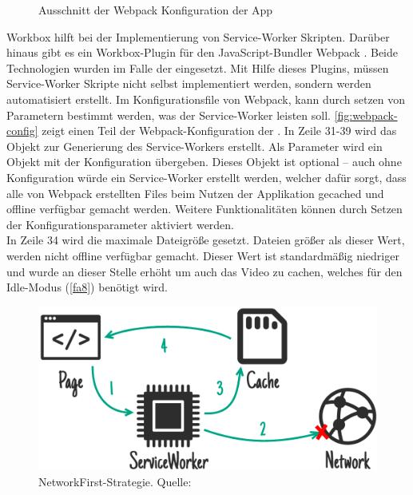 \begin{figure}
  
  \caption{Ausschnitt der Webpack Konfiguration der \shst{} App}
  \label{fig:webpack-config}
\end{figure}

Workbox hilft bei der Implementierung von Service-Worker Skripten. Darüber hinaus gibt es ein 
Workbox-Plugin \cite{workbox-webpack-plugin} für den JavaScript-Bundler Webpack \cite{webpack}. 
Beide Technologien wurden im Falle der \shst{} eingesetzt. Mit Hilfe dieses Plugins, müssen 
Service-Worker Skripte nicht selbst implementiert werden, sondern werden automatisiert erstellt.
Im Konfigurationsfile von Webpack, kann durch setzen von Parametern bestimmt werden, was
der Service-Worker leisten soll. \autoref{fig:webpack-config} zeigt einen Teil der 
Webpack-Konfiguration der \shst{}. In Zeile 31-39 wird das Objekt zur Generierung des
Service-Workers erstellt. Als Parameter wird ein Objekt mit der Konfiguration übergeben. 
Dieses Objekt ist optional -- auch ohne Konfiguration würde ein Service-Worker erstellt werden,
welcher dafür sorgt, dass alle von Webpack erstellten Files beim Nutzen der Applikation
gecached und offline verfügbar gemacht werden. Weitere Funktionalitäten können durch
Setzen der Konfigurationsparameter aktiviert werden.\\
In Zeile 34 wird die maximale Dateigröße gesetzt. 
Dateien größer als dieser Wert, werden nicht offline verfügbar gemacht. Dieser Wert
ist standardmäßig niedriger und wurde an dieser Stelle erhöht um auch das Video zu cachen, welches
für den Idle-Modus (\ref{fa8}) benötigt wird.

\begin{figure}
    \centering
    \includegraphics[width=1\textwidth]{figures/images/ss-network-falling-back-to-cache.png}
    \caption{NetworkFirst-Strategie. Quelle: \cite{offline-cookbook}}
    \label{fig:network-first}
\end{figure}

